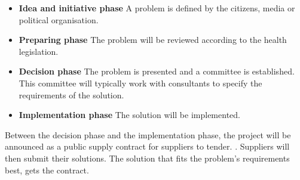\begin{itemize}
  \setlength{\itemsep}{1pt}
  \setlength{\parskip}{0pt}
  \setlength{\parsep}{0pt}
	\item \textbf{Idea and initiative phase} A problem is defined by the citizens, media or political organisation.
	\item \textbf{Preparing phase} The problem will be reviewed according to the health legislation.
	\item \textbf{Decision phase} The problem is presented and a committee is established. This committee will typically work with consultants to specify the requirements of the solution.
	\item \textbf{Implementation phase} The solution will be implemented. 
\end{itemize}


Between the decision phase and the implementation phase, the project will be announced as a public supply contract for suppliers to tender. \cite{Union2004}. Suppliers will then submit their solutions. The solution that fits the problem's requirements best, gets the contract. 


